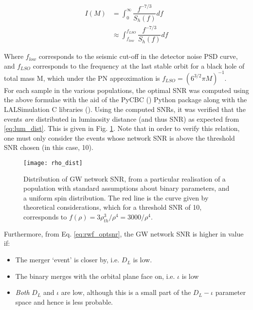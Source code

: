         \begin{align}
            I(M) &= \int_0^\infty \dfrac{f^{-7/3}}{S_h(f)} df \\
                 &\approx \int_{f_{low}}^{f_{LSO}} \dfrac{f^{-7/3}}{S_h(f)} df
            \label{eq:freq_integral}
        \end{align}

        Where $f_{low}$ corresponds to the seismic cut-off in the detector noise PSD
        curve, and $f_{LSO}$ corresponds to the frequency at the last stable orbit for a
        black hole of total mass M, which under the PN approximation is $f_{LSO} =
        (6^{3/2} \pi M)^{-1}$.\\
        For each sample in the various populations, the optimal SNR was computed using
        the above formulae with the aid of the PyCBC (\cite{pycbc}) Python package along
        with the LALSimulation C libraries (\cite{lalsuite}). Using the computed SNRs,
        it was verified that the events \textit{are} distributed in luminosity distance
        (and thus SNR) as expected from \ref{eq:lum_dist}. This is given in
        Fig. \ref{fig:rho_dist}. Note that in order to verify this relation, one must
        only consider the events whose network SNR is above the threshold SNR chosen (in
        this case, 10).\\

        \begin{figure}[H]
            \centering
            \texttt{[image: rho\_dist]}
            \caption[Distribution of GW network SNR]
            {
                Distribution of GW network SNR, from a particular realisation of a
                population with standard assumptions about binary parameters, and a
                uniform spin distribution. The red line is the curve given by
                theoretical considerations, which for a threshold SNR of 10, corresponds
                to $f(\rho) = 3\rho_{th}^3 / \rho^4 = 3000 / \rho^4$.
            }
            \label{fig:rho_dist}
        \end{figure}


        Furthermore, from Eq. \ref{eq:rwf_optsnr}, the GW network SNR is higher in value
        if:

        \begin{itemize}

            \item The merger `event' is closer by, i.e. $D_L$ is low.

            \item The binary merges with the orbital plane face on, i.e. $\iota$ is low

            \item \emph{Both} $D_L$ and $\iota$ are low, although this is a small part
                of the $D_L-\iota$ parameter space and hence is less probable.

        \end{itemize}

